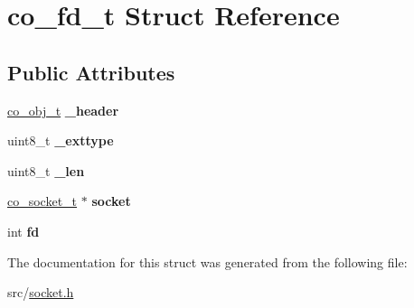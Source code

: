 \hypertarget{structco__fd__t}{\section{co\+\_\+fd\+\_\+t Struct Reference}
\label{structco__fd__t}
}
\subsection*{Public Attributes}
\begin{DoxyCompactItemize}
\item 
\hypertarget{structco__fd__t_a4f9740dc3303163c1f3c14c175d914b8}{\hyperlink{structco__obj__t}{co\+\_\+obj\+\_\+t} {\bfseries \+\_\+header}}\label{structco__fd__t_a4f9740dc3303163c1f3c14c175d914b8}

\item 
\hypertarget{structco__fd__t_a55526f24d89d89d4c3bc8cbccf48c253}{uint8\+\_\+t {\bfseries \+\_\+exttype}}\label{structco__fd__t_a55526f24d89d89d4c3bc8cbccf48c253}

\item 
\hypertarget{structco__fd__t_ad6fcd9e197237d63679db95b8c964190}{uint8\+\_\+t {\bfseries \+\_\+len}}\label{structco__fd__t_ad6fcd9e197237d63679db95b8c964190}

\item 
\hypertarget{structco__fd__t_a7249838c910948ac624d8e1d6d9b6dda}{\hyperlink{structco__socket__t}{co\+\_\+socket\+\_\+t} $\ast$ {\bfseries socket}}\label{structco__fd__t_a7249838c910948ac624d8e1d6d9b6dda}

\item 
\hypertarget{structco__fd__t_a64c95df9ae2fa0da751ec8fe03854e0d}{int {\bfseries fd}}\label{structco__fd__t_a64c95df9ae2fa0da751ec8fe03854e0d}

\end{DoxyCompactItemize}


The documentation for this struct was generated from the following file\+:\begin{DoxyCompactItemize}
\item 
src/\hyperlink{socket_8h}{socket.\+h}\end{DoxyCompactItemize}
